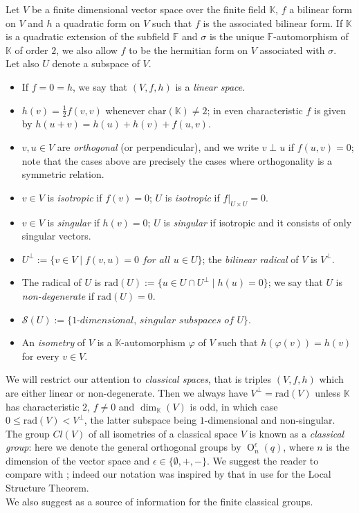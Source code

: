 \documentclass{amsart}
\numberwithin{equation}{section}
\theoremstyle{definition}
\theoremstyle{subresult}
\theoremstyle{caseresult}
\renewcommand{\phi}{\varphi}
\newcommand{\bF}{\mathbb{F}}
\newcommand{\bK}{\mathbb{K}}
\renewcommand{\S}{\mathcal{S}}
\renewcommand{\O}{\operatorname{O}}
\newcommand{\<}{\langle}
\renewcommand{\>}{\rangle}
\newcommand{\fieldchar}{\mathrm{char}}
\begin{document}
	\vspace{0.8cm}
	Let $V$ be a finite dimensional vector space over the finite field $\bK$, $f$ a bilinear form on $V$ and $h$ a quadratic form on $V$ such that $f$ is the associated bilinear form. If $\bK$ is a quadratic extension of the subfield $\bF$ and $\sigma$ is the unique $\bF$-automorphism of $\bK$ of order $2$, we also allow $f$ to be the hermitian form on $V$ associated with $\sigma$.\\
	Let also $U$ denote a subspace of $V$.
	\begin{itemize}
		\item If $f=0=h$, we say that $(V,f,h)$ is a \emph{linear space}.
		\item $h(v) = \displaystyle \frac{1}{2} f(v,v)$ whenever $\fieldchar(\bK) \ne 2$; in even characteristic $f$ is given by $h(u+v) = h(u) +h(v) + f(u,v)$.
		\item $v,u \in V$ are \emph{orthogonal} (or perpendicular), and we write $v \perp u$ if $f(u,v)=0$; note that the cases above are precisely the cases where orthogonality is a symmetric relation.
		\item $v \in V$ is \emph{isotropic} if $f(v) = 0$; $U$ is \emph{isotropic} if $f|_{U \times U} =0$.
		\item $v \in V$ is \emph{singular} if $h(v) = 0$; $U$ is \emph{singular} if isotropic and it consists of only singular vectors.
		\item $U^\perp := \{v \in V \mid f(v,u)=0 \textit{ for all } u \in U\}$; the \emph{bilinear radical} of $V$ is $V^\perp$.
		\item The radical of $U$ is $\mathrm{rad}(U) := \{u \in U \cap U^\perp \mid h(u)=0 \}$; we say that $U$ is \emph{non-degenerate} if $\mathrm{rad}(U) =0$.
		\item $\S(U) := \{ \textit{$1$-dimensional, singular subspaces of $U$} \}$.
		\item An \emph{isometry} of $V$ is a $\bK$-automorphism $\phi$ of $V$ such that $h(\phi(v))=h(v)$ for every $v \in V$.
	\end{itemize}
	We will restrict our attention to \emph{classical spaces}, that is triples $(V,f,h)$ which are either linear or non-degenerate. Then we always have $V^\perp = \mathrm{rad}(V)$ unless $\bK$ has characteristic $2$, $f \ne 0$ and $\dim_{\bK}(V)$ is odd, in which case $0 \le \mathrm{rad}(V) < V^\perp$, the latter subspace being $1$-dimensional and non-singular. The group $Cl(V)$ of all isometries of a classical space $V$ is known as a \emph{classical group}: here we denote the general orthogonal groups by $\O_n^\epsilon(q)$, where $n$ is the dimension of the vector space and $\epsilon \in \{\emptyset,+,-\}$. We suggest the reader to compare with \cite[Appendix B]{Meier-Stell-Stroth:2012}; indeed our notation was inspired by that in use for the Local Structure Theorem.\\
	We also suggest \cite{Grove:2001} as a source of information for the finite classical groups.\\
	
\end{document}
